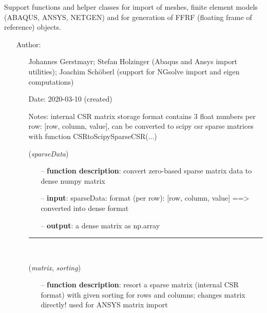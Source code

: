 \begin{itemize}[leftmargin=1.4cm]
\begin{itemize}[leftmargin=0.5cm]
%
\label{sec:module:FEM}
  Support functions and helper classes for import of meshes, finite element models (ABAQUS, ANSYS, NETGEN) and for generation of FFRF (floating frame of reference) objects.
\begin{itemize}[leftmargin=1.4cm]
\setlength{\itemindent}{-1.4cm}
\item[]Author:
\vspace{-22pt}\begin{itemize}[leftmargin=0.5cm]
\setlength{\itemindent}{-0.5cm}
\item[]   Johannes Gerstmayr; Stefan Holzinger (Abaqus and Ansys import utilities); Joachim Sch\"oberl (support for NGsolve import and eigen computations)
\ei
\item[]Date:      2020-03-10 (created)
\item[]Notes:  	internal CSR matrix storage format contains 3 float numbers per row: [row, column, value], can be converted to scipy csr sparse matrices with function CSRtoScipySparseCSR(...)
\ei
\begin{flushleft}
\label{sec:FEM:CompressedRowSparseToDenseMatrix}
({\it sparseData})
\end{flushleft}
\setlength{\itemindent}{0.7cm}
\begin{itemize}[leftmargin=0.7cm]
  \item[--]  {\bf function description}: convert zero-based sparse matrix data to dense numpy matrix  \item[--]  {\bf input}: sparseData: format (per row): [row, column, value] ==> converted into dense format  \item[--]  {\bf output}: a dense matrix as np.array\vspace{12pt}\end{itemize}
%
\noindent\rule{8cm}{0.75pt}\vspace{1pt} \\ 
\begin{flushleft}
\label{sec:FEM:MapSparseMatrixIndices}
({\it matrix}, {\it sorting})
\end{flushleft}
\setlength{\itemindent}{0.7cm}
\begin{itemize}[leftmargin=0.7cm]
  \item[--]  {\bf function description}: resort a sparse matrix (internal CSR format) with given sorting for rows and columns; changes matrix directly! used for ANSYS matrix import\vspace{12pt}\end{itemize}

\end{itemize}
\end{itemize}
\end{itemize}
\end{itemize}
